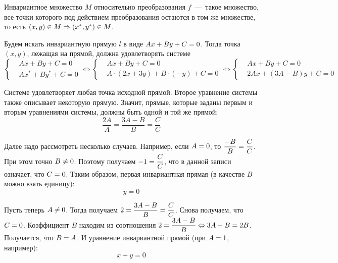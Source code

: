 \documentclass[a4paper,12pt]{article}
\begin{document}
  \begin{solution}
    \begin{definition}
      Инвариантное множество $M$ относительно преобразования $f$~---~такое множество, все точки которого под действием преобразования остаются в том же множестве, то есть $(x, y) \hm\in M \hm\Rightarrow (x^*, y^*) \hm\in M$.
    \end{definition}
    
    Будем искать инвариантную прямую $l$ в виде $Ax \hm+ By \hm+ C \hm= 0$.
    Тогда точка $(x, y)$, лежащая на прямой, должна удовлетворять системе
    \[
      \left\{
        \begin{aligned}
          &Ax + By + C = 0\\
          &Ax^* + By^* + C = 0
        \end{aligned}
      \right.
      \Leftrightarrow
      \left\{
        \begin{aligned}
          &Ax + By + C = 0\\
          &A\cdot (2x + 3y) + B\cdot (-y) + C = 0
        \end{aligned}
      \right.
      \Leftrightarrow
      \left\{
        \begin{aligned}
          &Ax + By + C = 0\\
          &2Ax + (3A - B)y + C = 0
        \end{aligned}
      \right.
    \]
    
    Системе удовлетворяет любая точка исходной прямой.
    Второе уравнение системы также описывает некоторую прямую.
    Значит, прямые, которые заданы первым и вторым уравнениями системы, должны быть одной и той же прямой:
    \[
      \frac{2A}{A} = \frac{3A - B}{B} = \frac{C}{C}
    \]
    
    Далее надо рассмотреть несколько случаев.
    Например, если $A \hm= 0$, то $\dfrac{-B}{B} \hm= \dfrac{C}{C}$.
    При этом точно $B \hm{\not=} 0$.
    Поэтому получаем $-1 \hm= \dfrac{C}{C}$, что в данной записи означает, что $C \hm= 0$.
    Таким образом, первая инвариантная прямая (в качестве $B$ можно взять единицу):
    \[
      y = 0
    \]
    
    Пусть теперь $A \hm{\not=} 0$.
    Тогда получаем $2 \hm= \dfrac{3A - B}{B} = \dfrac{C}{C}$.
    Снова получаем, что $C \hm= 0$.
    Коэффициент $B$ находим из соотношения $2 \hm= \dfrac{3A - B}{B} \hm{\Leftrightarrow} 3A \hm- B \hm= 2B$.
    Получается, что $B \hm= A$.
    И уравнение инвариантной прямой (при $A \hm= 1$, например):
    \[
      x + y = 0
    \]
    
  \end{solution}
  
\end{document}
